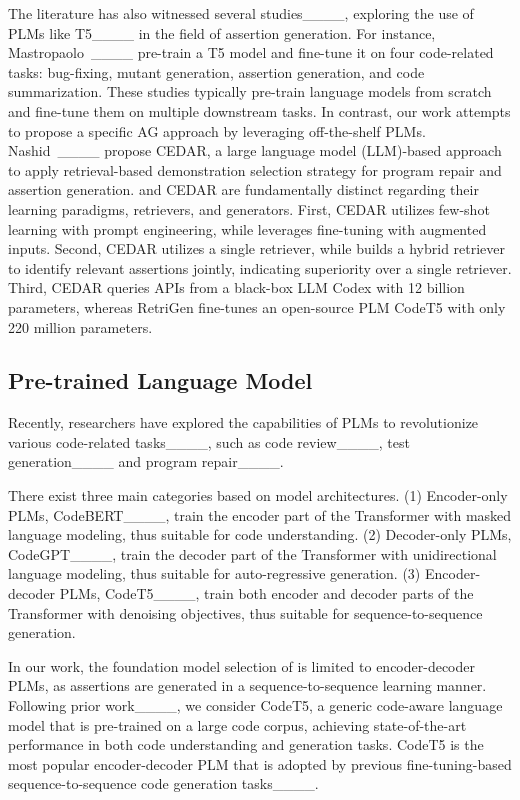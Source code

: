 The literature has also witnessed several studies____, exploring the use of PLMs like T5____ in the field of assertion generation.
For instance, Mastropaolo~\etal____ pre-train a T5 model and fine-tune it on four code-related tasks: bug-fixing, mutant generation, assertion generation, and code summarization.
These studies typically pre-train language models from scratch and fine-tune them on multiple downstream tasks.
In contrast, our work attempts to propose a specific AG approach by leveraging off-the-shelf PLMs. 
Nashid~\etal____ propose CEDAR, a large language model (LLM)-based approach to apply retrieval-based demonstration selection strategy for program repair and assertion generation.
\toolname{} and CEDAR are fundamentally distinct regarding their learning paradigms, retrievers, and generators.
First, CEDAR utilizes few-shot learning with prompt engineering, while \toolname{} leverages fine-tuning with augmented inputs.
Second, CEDAR utilizes a single retriever, while \toolname{} builds a hybrid retriever to identify relevant assertions jointly, indicating superiority over a single retriever. 
Third, CEDAR queries APIs from a black-box LLM Codex with 12 billion parameters, whereas RetriGen fine-tunes an open-source PLM CodeT5 with only 220 million parameters. 


\subsection{Pre-trained Language Model}
\label{sec:background_LLM}


Recently, researchers have explored the capabilities of PLMs to revolutionize various code-related tasks____, such as code review____, test generation____ and program repair____.

There exist three main categories based on model architectures.
(1) Encoder-only PLMs, \eg CodeBERT____, train the encoder part of the Transformer with masked language modeling, thus suitable for code understanding.
(2) Decoder-only PLMs, \eg CodeGPT____, train the decoder part of the Transformer with unidirectional language modeling, thus suitable for auto-regressive generation.
(3) Encoder-decoder PLMs, \eg CodeT5____, train both encoder and decoder parts of the Transformer with denoising objectives, thus suitable for sequence-to-sequence generation.

In our work, the foundation model selection of \toolname{} is limited to encoder-decoder PLMs, as assertions are generated in a sequence-to-sequence learning manner.
Following prior work____, we consider CodeT5, a generic code-aware language model that is pre-trained on a large code corpus, achieving state-of-the-art performance in both code understanding and generation tasks.
CodeT5 is the most popular encoder-decoder PLM that is adopted by previous fine-tuning-based sequence-to-sequence code generation tasks____.



